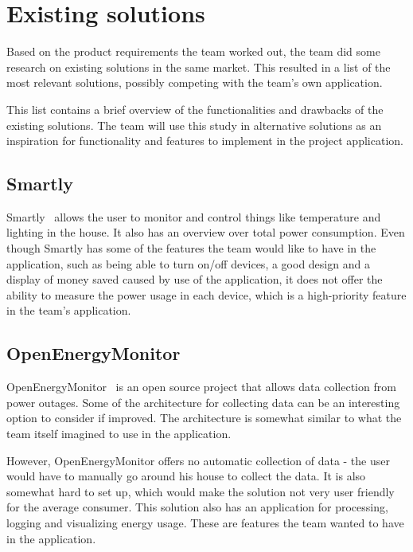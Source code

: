 \section{Existing solutions}
\label{sec:altsolution}
Based on the product requirements the team worked out, the team did some research on existing solutions in the same market. This resulted in a list of the most relevant solutions, possibly competing with the team's own application.
 
This list contains a brief overview of the functionalities and drawbacks of the existing solutions. The team will use this study in alternative solutions as an inspiration for functionality and features to implement in the project application.

\subsection{Smartly}

Smartly~\cite{smartly} allows the user to monitor and control things like temperature and lighting in the house. It also has an overview over total power consumption. Even though Smartly has some of the features the team would like to have in the application, such as being able to turn on/off devices, a good design and a display of money saved caused by use of the application, it does not offer the ability to measure the power usage in each device, which is a high-priority feature in the team's application.

\subsection{OpenEnergyMonitor}

OpenEnergyMonitor~\cite{openenergymonitor} is an open source project that allows data collection from power outages. Some of the architecture for collecting data can be an interesting option to consider if improved. The architecture is somewhat similar to what the team itself imagined to use in the application. 

However, OpenEnergyMonitor offers no automatic collection of data - the user would have to manually go around his house to collect the data. It is also somewhat hard to set up, which would make the solution not very user friendly for the average consumer. This solution also has an application for processing, logging and visualizing energy usage. These are features the team wanted to have in the application.


